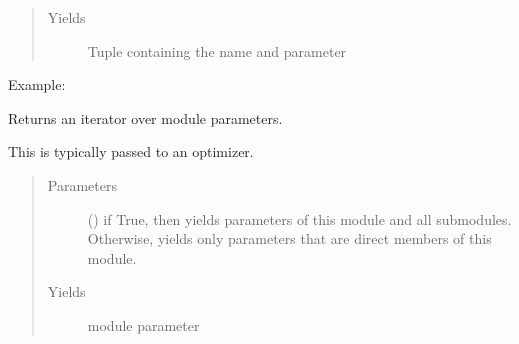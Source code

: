 \documentclass[letterpaper,10pt,english]{sphinxmanual}
\begin{document}
\begin{fulllineitems}
\begin{fulllineitems}
\begin{quote}
\begin{description}
\begin{itemize}
\end{itemize}

\item[{Yields}] \leavevmode
{} \textendash{} Tuple containing the name and parameter

\end{description}\end{quote}

Example:

\begin{sphinxVerbatim}[commandchars=\\\{\}]
    
      \PYG{p}{[}\PYG{p}{]}
       
\end{sphinxVerbatim}

\end{fulllineitems}


\begin{fulllineitems}
\label{\detokenize{api/dynamics:geology.metamodelling.dynamics.LatentSpaceDynamics.parameters}}
Returns an iterator over module parameters.

This is typically passed to an optimizer.
\begin{quote}\begin{description}
\item[{Parameters}] \leavevmode
{} () \textendash{} if True, then yields parameters of this module
and all submodules. Otherwise, yields only parameters that
are direct members of this module.

\item[{Yields}] \leavevmode
{} \textendash{} module parameter


\end{description}
\end{quote}
\end{fulllineitems}
\end{fulllineitems}
\end{document}
